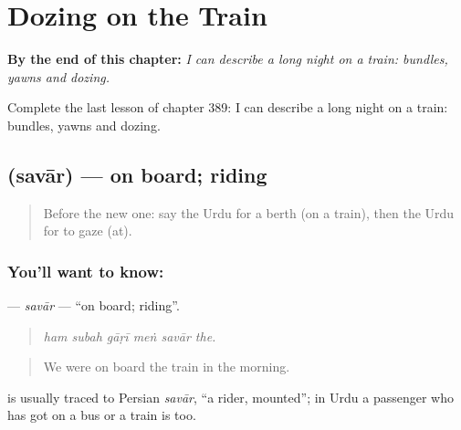 
\chapter{Dozing on the Train}
\label{ch:ur-dozing-on-the-train}

\begin{chapteropening}
\textbf{By the end of this chapter:} \emph{I can describe a long night on a train: bundles, yawns and dozing.}

Complete the last lesson of chapter 389: I can describe a long night on a train: bundles, yawns and dozing.
\end{chapteropening}

\section[\texorpdfstring{\ur{سوار} (savār)}{سوار (savār)}]{ (savār) — on board; riding}

\label{lesson:UR-C389-savar}



\begin{quote}
Before the new one: say the Urdu for a berth (on a train), then the Urdu for to gaze (at).
\end{quote}

\subsection*{You'll want to know: }
\textbf{} — \emph{savār} — \textquotedblleft{}on board; riding\textquotedblright{}.

\begin{quote}
     
\end{quote}

\begin{quote}
\emph{ham subah gāṛī meṅ savār the.}
\end{quote}

\begin{quote}
We were on board the train in the morning.
\end{quote}

\begin{cousinweb}
is usually traced to Persian \emph{savār}, \textquotedblleft{}a rider, mounted\textquotedblright{}; in Urdu a passenger who has got on a bus or a train is \textbf{} too.
\end{cousinweb}

